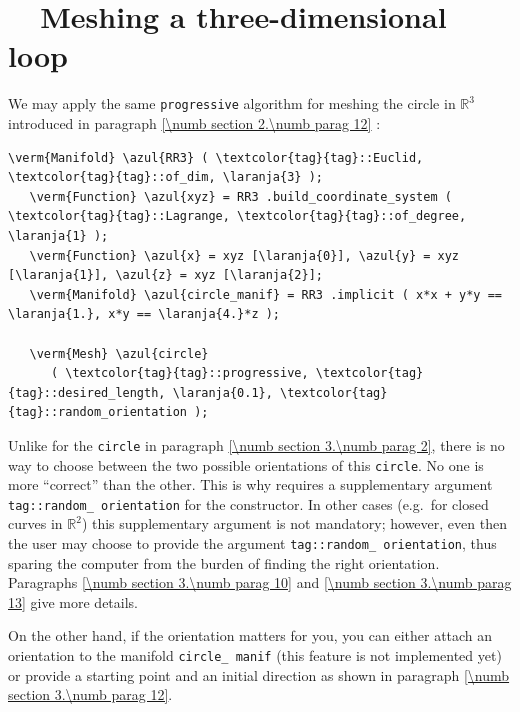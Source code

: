 \section{~~Meshing a three-dimensional loop}\label{\numb section 3.\numb parag 4}

We may apply the same {\small\tt progressive} algorithm for meshing the circle in
$ \mathbb{R}^3 $ introduced in paragraph \ref{\numb section 2.\numb parag 12} :

\begin{Verbatim}[commandchars=\\\{\},formatcom=\small\tt,frame=single,
   label=parag-\ref{\numb section 3.\numb parag 4}.cpp,rulecolor=\color{coment},
   baselinestretch=0.94,framesep=2mm                                            ]
   \verm{Manifold} \azul{RR3} ( \textcolor{tag}{tag}::Euclid, \textcolor{tag}{tag}::of_dim, \laranja{3} );
   \verm{Function} \azul{xyz} = RR3 .build_coordinate_system ( \textcolor{tag}{tag}::Lagrange, \textcolor{tag}{tag}::of_degree, \laranja{1} );
   \verm{Function} \azul{x} = xyz [\laranja{0}], \azul{y} = xyz [\laranja{1}], \azul{z} = xyz [\laranja{2}];
   \verm{Manifold} \azul{circle_manif} = RR3 .implicit ( x*x + y*y == \laranja{1.}, x*y == \laranja{4.}*z );
   
   \verm{Mesh} \azul{circle}
      ( \textcolor{tag}{tag}::progressive, \textcolor{tag}{tag}::desired_length, \laranja{0.1}, \textcolor{tag}{tag}::random_orientation );
\end{Verbatim}

Unlike for the {\small\tt circle} in paragraph \ref{\numb section 3.\numb parag 2},
there is no way to choose between the two possible orientations of this {\small\tt circle}.
No one is more ``correct'' than the other.
This is why {\maniFEM} requires a supplementary argument
{\small\tt \textcolor{tag}{tag}::random\_\,orientation}
for the {\small\tt {}} constructor.
In other cases (e.g.\ for closed curves in $ \mathbb{R}^2 $) this supplementary argument
is not mandatory; however, even then the user may choose to provide the argument
{\small\tt \textcolor{tag}{tag}::random\_\,orientation}, thus sparing the computer from the burden of
finding the right orientation.
Paragraphs \ref{\numb section 3.\numb parag 10} and \ref{\numb section 3.\numb parag 13}
give more details.

On the other hand, if the orientation matters for you, you can either attach an orientation
to the manifold {\small\tt circle\_\,manif} (this feature is not implemented yet)
or provide a starting point and an initial direction as shown in paragraph
\ref{\numb section 3.\numb parag 12}.


